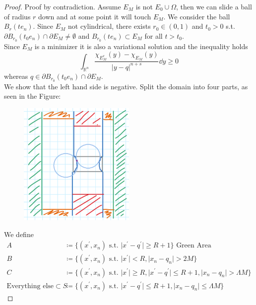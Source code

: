 \begin{proof}
	Proof by contradiction. Assume \( E_M \) is not \( E_0 \cup \Omega \), then we can
	slide a ball of radius \( r \) down and at some point it will touch \( E_M \). We
	consider the ball \( B_r (t e_n) \). Since \( E_M \) not cylindrical, there exists \(
	r_0 \in (0,1) \) and \( t_0 > 0 \) s.t.\ \( \partial B_{r_0}(t_0 e_n) \cap \partial
	E_M \neq \emptyset \) and \( B_{r_0}(t e_n) \subset E_M \) for all \( t > t_0 \). \\
	Since \( E_M \) is a minimizer it is also a variational solution and the inequality
	holds
	\[
		\int_{\mathbb{R}^n} \frac{\chi_{E_M^c}(y)-\chi_{E_M} (y)}{\lvert y-q\rvert^{n+s}} \dd{y} \geq 0
	\]
	whereas \( q \in \partial B_{r_0}(t_0 e_n) \cap \partial E_M \). \\
	We show that the left hand side is negative. Split the domain into four parts, as seen
	in the Figure:
	\begin{figure}[h]
		\centering
		\includegraphics[width = 0.5\textwidth]{figures/Screenshot_20240105_020915.png}
		\caption{}
		\label{fig:-01}
	\end{figure}
	\par
	We define
	\begin{align*}
		A                                & \coloneqq \{ (x^\prime,x_n) \text{ s.t. } \lvert x^\prime -q^\prime \rvert \geq R+1\} \text{ Green Area} \\
		B                                & \coloneqq \{ (x^\prime,x_n) \text{ s.t. } \lvert x^\prime \rvert < R, \lvert x_n -q_n \rvert > 2M \} \\
		C                                & \coloneqq \{ (x^\prime,x_n) \text{ s.t. } \lvert x^\prime \rvert \geq R, \lvert x^\prime - q^\prime \rvert \leq R+1, \lvert x_n -q_n \rvert > \Lambda M \} \\
		\text{Everything else} \subset S & \coloneqq \{(x^\prime,x_n) \text{ s.t. } \lvert x^\prime -q^\prime \rvert \leq R+1, \lvert x_n -q_n \rvert \leq \Lambda M \}
	\end{align*}



\end{proof}
